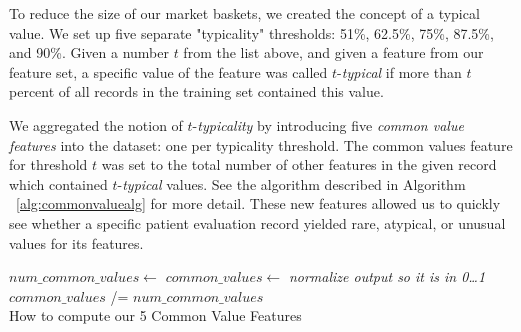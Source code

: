 To reduce the size of our market baskets, we created the concept of a \textsf{typical value}. We set up five separate "typicality" thresholds: 51\%, 62.5\%,
75\%, 87.5\%, and 90\%.  Given a number $t$ from the list above, and given
a feature from our feature set,
a specific value of the feature was called $t$-\textit{typical} if more
than $t$ percent of all records in the training set contained this value.

\par{
We aggregated the notion of $t$-\textit{typicality} by introducing
five \textit{common value features} into the dataset: one per typicality
threshold. The common values feature for threshold $t$ was set to the total number of other features in the given record which contained $t$-\textit{typical} values. See the algorithm described in Algorithm ~\ref{alg:commonvaluealg} for more detail.
These new features allowed us to quickly see whether a specific patient evaluation record yielded rare, atypical, or unusual values for its features.
}


\begin{algorithm}[h] 
 
 
 \BlankLine
 $num\_common\_values \gets$  \;
 $common\_values \gets$  \;
 \emph{normalize output so it is in 0\ldots1} \\ 
 $common\_values$ /= $num\_common\_values$ \\
 \caption{How to compute our 5 Common Value Features}
 \label{alg:commonvaluealg}
\end{algorithm}
